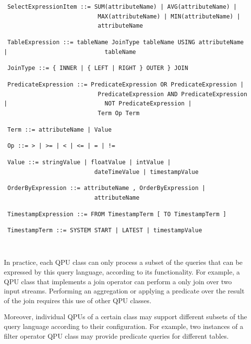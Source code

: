 {\obeylines\obeyspaces
\texttt{
SelectExpressionItem  ::=  SUM(attributeName) | AVG(attributeName) |
~~~~~~~~~~~~~~~~~~~~~~~~~~~MAX(attributeName) | MIN(attributeName) |
~~~~~~~~~~~~~~~~~~~~~~~~~~~attributeName
}}

{\obeylines\obeyspaces
\texttt{
TableExpression       ::=  tableName JoinType tableName USING attributeName |
~~~~~~~~~~~~~~~~~~~~~~~~~~~tableName
}}

{\obeylines\obeyspaces
\texttt{
JoinType              ::=  \{ INNER | \{ LEFT | RIGHT \} OUTER \} JOIN
}}

{\obeylines\obeyspaces
\texttt{
PredicateExpression   ::=  PredicateExpression OR PredicateExpression |
~~~~~~~~~~~~~~~~~~~~~~~~~~~PredicateExpression AND PredicateExpression |
~~~~~~~~~~~~~~~~~~~~~~~~~~~NOT PredicateExpression |
~~~~~~~~~~~~~~~~~~~~~~~~~~~Term Op Term
}}

{\obeylines\obeyspaces
\texttt{
Term                  ::=  attributeName | Value
}}

{\obeylines\obeyspaces
\texttt{
Op                    ::= > | >= | < | <= | = | !=
}}

{\obeylines\obeyspaces
\texttt{
Value                 ::= stringValue | floatValue | intValue |
~~~~~~~~~~~~~~~~~~~~~~~~~~dateTimeValue | timestampValue
}}

{\obeylines\obeyspaces
\texttt{
OrderByExpression     ::= attributeName , OrderByExpression |
~~~~~~~~~~~~~~~~~~~~~~~~~~attributeName
}}

{\obeylines\obeyspaces
\texttt{
TimestampExpression   ::= FROM TimestampTerm [ TO TimestampTerm ]
}}

{\obeylines\obeyspaces
\texttt{
TimestampTerm         ::= SYSTEM START | LATEST | timestampValue
}}

~ \bigskip

In practice, each QPU class can only process a subset of the queries that can be expressed by this query language,
according to its functionality.
For example, a QPU class that implements a join operator can perform a only join over two input streams.
Performing an aggregation or applying a predicate over the result of the join requires this use of other QPU classes.


Moreover, individual QPUs of a certain class may support different subsets of the query language according to their
configuration.
For example, two instances of a filter operator QPU class may provide predicate queries for different tables.

